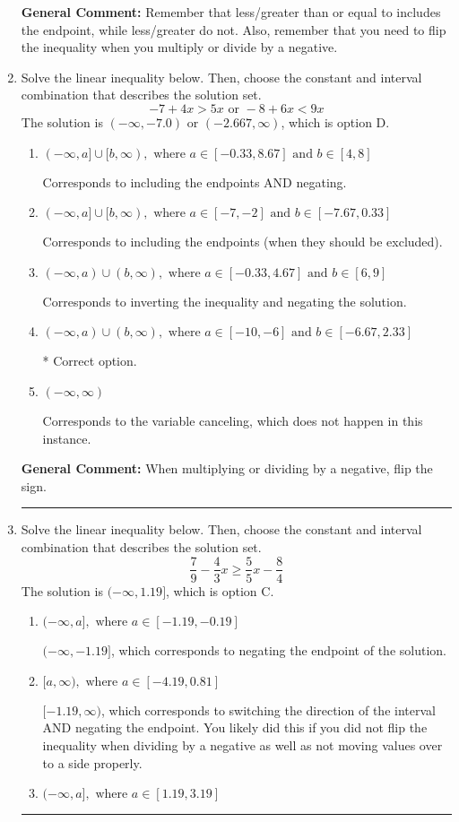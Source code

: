 \documentclass{extbook}[14pt]
\newcommand{\litem}[1]{\item #1

\rule{\textwidth}{0.4pt}}
\begin{document}
\begin{enumerate}
{\textbf{General Comment:} Remember that less/greater than or equal to includes the endpoint, while less/greater do not. Also, remember that you need to flip the inequality when you multiply or divide by a negative.
}
\litem{
Solve the linear inequality below. Then, choose the constant and interval combination that describes the solution set.
\[ -7 + 4 x > 5 x \text{ or } -8 + 6 x < 9 x \]
The solution is \( (-\infty, -7.0) \text{ or } (-2.667, \infty) \), which is option D.\begin{enumerate}[label=\Alph*.]
\item \( (-\infty, a] \cup [b, \infty), \text{ where } a \in [-0.33, 8.67] \text{ and } b \in [4, 8] \)

Corresponds to including the endpoints AND negating.
\item \( (-\infty, a] \cup [b, \infty), \text{ where } a \in [-7, -2] \text{ and } b \in [-7.67, 0.33] \)

Corresponds to including the endpoints (when they should be excluded).
\item \( (-\infty, a) \cup (b, \infty), \text{ where } a \in [-0.33, 4.67] \text{ and } b \in [6, 9] \)

Corresponds to inverting the inequality and negating the solution.
\item \( (-\infty, a) \cup (b, \infty), \text{ where } a \in [-10, -6] \text{ and } b \in [-6.67, 2.33] \)

 * Correct option.
\item \( (-\infty, \infty) \)

Corresponds to the variable canceling, which does not happen in this instance.
\end{enumerate}

\textbf{General Comment:} When multiplying or dividing by a negative, flip the sign.
}
\litem{
Solve the linear inequality below. Then, choose the constant and interval combination that describes the solution set.
\[ \frac{7}{9} - \frac{4}{3} x \geq \frac{5}{5} x - \frac{8}{4} \]
The solution is \( (-\infty, 1.19] \), which is option C.\begin{enumerate}[label=\Alph*.]
\item \( (-\infty, a], \text{ where } a \in [-1.19, -0.19] \)

 $(-\infty, -1.19]$, which corresponds to negating the endpoint of the solution.
\item \( [a, \infty), \text{ where } a \in [-4.19, 0.81] \)

 $[-1.19, \infty)$, which corresponds to switching the direction of the interval AND negating the endpoint. You likely did this if you did not flip the inequality when dividing by a negative as well as not moving values over to a side properly.
\item \( (-\infty, a], \text{ where } a \in [1.19, 3.19] \)


\end{enumerate}}
\end{enumerate}
\end{document}
